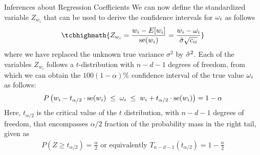 \begin{frame}{Inferences about Regression Coefficients}
We can now define the standardized variable $Z_{w_{i}}$ that can be
used to derive the confidence intervals for $\omega_i$ as follows
\begin{align*}
    \tcbhighmath{
    Z_{w_{i}} = \frac{w_i - E[w_i]}{\se(w_i)} = 
\frac{w_i - \truew_i}{\hsigma \sqrt{c_{ii}}}}
\end{align*}
where we have replaced the unknown true variance $\sigma^2$ by
$\hat{\sigma}^2$. Each of the variables $Z_{w_i}$ follows a $t$-distribution
with $n-d-1$ degrees of freedom, from which we can obtain the
$100(1-\alpha)$\% confidence
interval of the true value $\omega_i$ as follows:
\begin{align*}
    P\left(w_i -t_{\alpha/2} \cdot \operatorname{se}(w_i) \; \le
        \; \omega_i \;
    \le \; w_i + t_{\alpha/2} \cdot \operatorname{se}(w_i)\right) =
    1-\alpha
\end{align*}
Here, $t_{\alpha/2}$ is the critical value of the $t$ distribution, with
$n-d-1$ degrees of freedom, that encompasses $\alpha/2$ fraction of the
probability mass in the right tail, given as
\begin{align*}
    P(Z \ge t_{\alpha/2}) = \tfrac{\alpha}{2}
    \text{ or equivalently }
    T_{n-d-1}(t_{\alpha/2}) = 1 - \tfrac{\alpha}{2}
\end{align*}

\end{frame}
%
%
